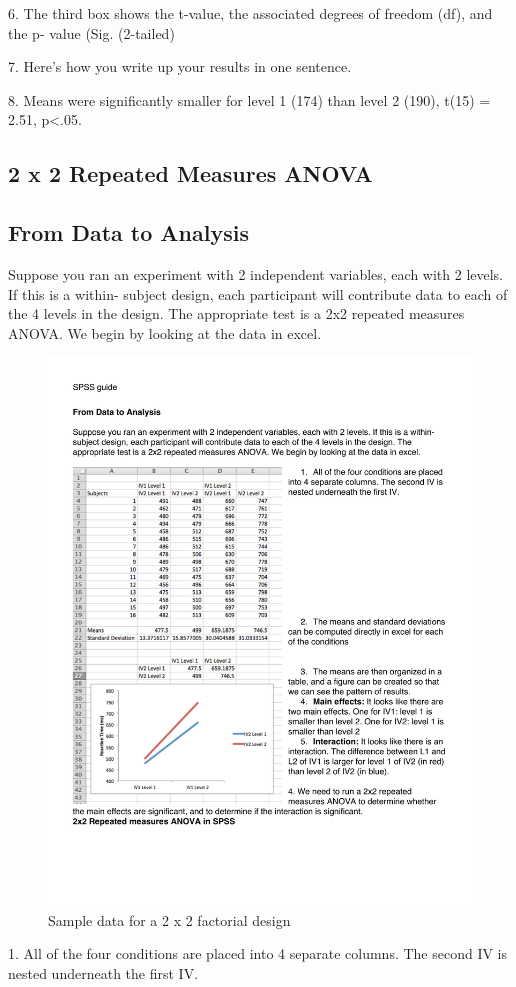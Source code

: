 6. The third box shows the t-value, the associated degrees of freedom (df), and the p- value (Sig. (2-tailed)


7. Here's how you write up your results in one sentence.


8. Means were significantly smaller for level 1 (174) than level 2 (190), t(15) = 2.51, p<.05.
  
\subsection{2 x 2 Repeated Measures ANOVA}
\subsection{From Data to Analysis}

Suppose you ran an experiment with 2 independent variables, each with 2 levels. If this is a within- subject design, each participant will contribute data to each of the 4 levels in the design. The appropriate test is a 2x2 repeated measures ANOVA. We begin by looking at the data in excel.


\begin{figure}
      \includegraphics[width=.7\linewidth]{LabmanualFigures/SPSS5.pdf}
      \caption{Sample data for a 2 x 2 factorial design}
      \label{fig:SPSS5}
\end{figure}

1. All of the four conditions are placed into 4 separate columns. The second IV is nested underneath the first IV.

